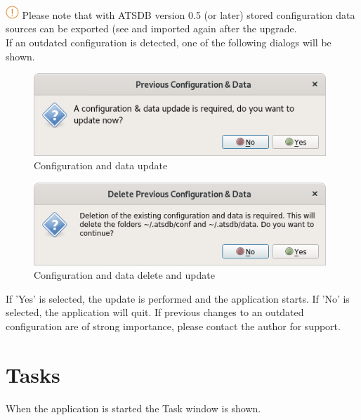 \includegraphics[width=0.5cm]{../../data/icons/hint.png} Please note that with ATSDB version 0.5 (or later) stored configuration data sources can be exported (see  and imported again after the upgrade. \\

If an outdated configuration is detected, one of the following dialogs will be shown.

\begin{figure}[H]
    \includegraphics[width=11cm]{../screenshots/config_data_update.png}
  \caption{Configuration and data update}
\end{figure}

\begin{figure}[H]
    \includegraphics[width=11cm]{../screenshots/config_data_delete_update.png}
  \caption{Configuration and data delete and update}
\end{figure}

If 'Yes' is selected, the update is performed and the application starts. If 'No' is selected, the application will quit. If previous changes to an outdated configuration are of strong importance, please contact the author for support. 

\section{Tasks}

When the application is started the Task window is shown. 

